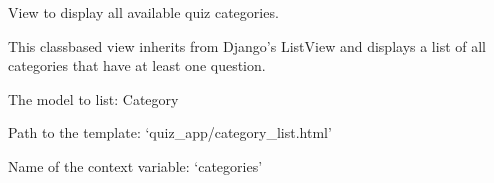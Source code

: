\documentclass[letterpaper,10pt,english]{sphinxmanual}
\begin{document}
\begin{fulllineitems}
\label{\detokenize{views:CategoryListView}}
\pysigstartsignatures
{}
\pysigstopsignatures
\sphinxAtStartPar
View to display all available quiz categories.

\sphinxAtStartPar
This class\sphinxhyphen{}based view inherits from Django’s ListView and displays
a list of all categories that have at least one question.

\begin{fulllineitems}
\label{\detokenize{views:CategoryListView.model}}
\pysigstartsignatures
{}
\pysigstopsignatures
\sphinxAtStartPar
The model to list: Category

\end{fulllineitems}


\begin{fulllineitems}
\label{\detokenize{views:CategoryListView.template_name}}
\pysigstartsignatures
{}
\pysigstopsignatures
\sphinxAtStartPar
Path to the template: ‘quiz\_app/category\_list.html’

\end{fulllineitems}


\begin{fulllineitems}
\label{\detokenize{views:CategoryListView.context_object_name}}
\pysigstartsignatures
{}
\pysigstopsignatures
\sphinxAtStartPar
Name of the context variable: ‘categories’

\end{fulllineitems}


\end{fulllineitems}
\end{document}
